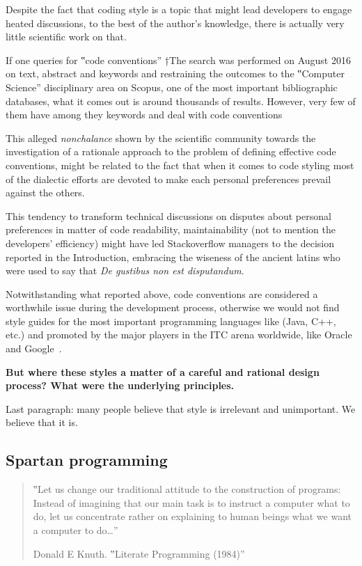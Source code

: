 Despite the fact that coding style is a topic that might lead developers to
engage heated discussions, to the best of the author's knowledge, there is
actually very little scientific work on that.

If one queries for ‟code conventions” †{The search was
performed on August 2016 on text, abstract and keywords and
restraining the outcomes to the ‟Computer Science” disciplinary area} on
Scopus, one of the most important bibliographic
databases, what it comes out is around thousands of results. However, very few of them have  among they keywords and deal with code conventions

This alleged \emph{nonchalance} shown by the scientific community towards the
investigation of a rationale approach to the problem of defining effective code
conventions, might be related to the fact that when it comes to code styling
most of the dialectic efforts are devoted
to make each personal preferences prevail against the others.

This tendency to transform technical discussions on disputes about personal preferences
in matter of code readability, maintainability (not to mention the developers' efficiency) might
have led Stackoverflow managers to the decision reported in the Introduction, embracing the
wiseness of the ancient latins who were used to say that \emph{De gustibus non est disputandum}.

Notwithstanding what reported above, code conventions are considered a worthwhile issue during
the development process, otherwise we would not find style guides for the most important
programming languages like (Java, C++, etc.) and promoted by the major players in
the ITC arena worldwide, like Oracle and Google~\cite{}.

\textbf{But where these styles a matter of a careful and rational design process?
What were the underlying principles.}

Last paragraph: many people believe that style is irrelevant and unimportant.
We believe that it is.

\subsection{Spartan programming}

\begin{quote}
  ‟Let us change our traditional attitude to the construction of programs:
  Instead of imagining that our main task is to instruct a computer what to do,
  let us concentrate rather on explaining to human beings what we want a computer
  to do…”
  \begin{flushright}
   \upshape Donald E Knuth. ‟Literate Programming (1984)”
  \end{flushright}
\end{quote}

